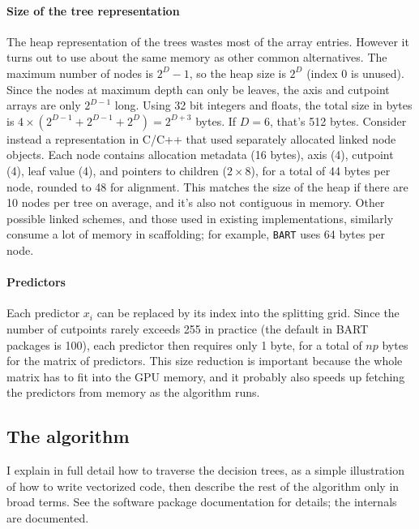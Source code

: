 \documentclass{article}
\begin{document}
    \paragraph{Size of the tree representation}

    The heap representation of the trees wastes most of the array entries. However it turns out to use about the same memory as other common alternatives. The maximum number of nodes is $2^D - 1$, so the heap size is $2^D$ (index 0 is unused). Since the nodes at maximum depth can only be leaves, the axis and cutpoint arrays are only $2^{D-1}$ long. Using 32 bit integers and floats, the total size in bytes is $4 \times (2^{D-1} + 2^{D-1} + 2^{D}) = 2^{D+3}$ bytes. If $D=6$, that's 512 bytes. Consider instead a representation in C/C++ that used separately allocated linked node objects. Each node contains allocation metadata (16 bytes), axis (4), cutpoint (4), leaf value (4), and pointers to children ($2\times 8$), for a total of 44 bytes per node, rounded to 48 for alignment. This matches the size of the heap if there are 10 nodes per tree on average, and it's also not contiguous in memory. Other possible linked schemes, and those used in existing implementations, similarly consume a lot of memory in scaffolding; for example, \texttt{BART} uses 64 bytes per node. %

    \paragraph{Predictors}

    Each predictor $x_i$ can be replaced by its index into the splitting grid. Since the number of cutpoints rarely exceeds 255 in practice (the default in BART packages is 100), each predictor then requires only 1 byte, for a total of $np$ bytes for the matrix of predictors. This size reduction is important because the whole matrix has to fit into the GPU memory, and it probably also speeds up fetching the predictors from memory as the algorithm runs.

    \subsection{The algorithm}

    I explain in full detail how to traverse the decision trees, as a simple illustration of how to write vectorized code, then describe the rest of the algorithm only in broad terms. See the software package documentation for details; the internals are documented.
\end{document}
